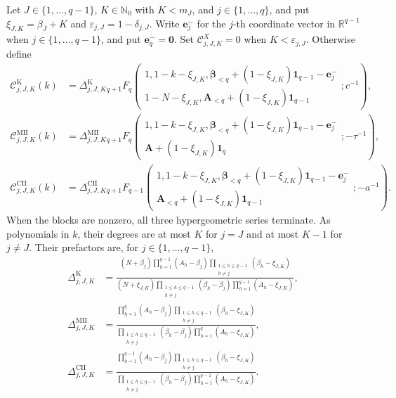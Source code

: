 \documentclass[10pt]{amsart}
\newcommand{\Nzero}{\mathbb N_0}
\newcommand{\one}{\boldsymbol 1}
\newcommand{\A}{\boldsymbol A}
\newcommand{\bbeta}{\boldsymbol\beta}
\newcommand{\ee}{\boldsymbol e}
\newcommand{\pFq}[5]{{}_{#1}F_{#2}\!\left(\begin{matrix}#3\\#4\end{matrix};#5\right)}
\theoremstyle{plain}
\theoremstyle{definition}
\theoremstyle{remark}
\begin{document}
Let \(J\in\{1,\ldots,q-1\}\), \(K\in\Nzero\) with \(K<m_J\), and
\(j\in\{1,\ldots,q\}\), and put
\(\xi_{J,K}=\beta_J+K\) and
\(\varepsilon_{j,J}=1-\delta_{j,J}\).
Write \(\ee_j^-\) for the \(j\)-th coordinate vector in
\(\mathbb R^{q-1}\) when \(j\in\{1,\ldots,q-1\}\), and put
\(\ee_q^-=\boldsymbol0\).
Set \(\mathcal C_{j,J,K}^X=0\) when
\(K<\varepsilon_{j,J}\).  Otherwise define
\begin{align}
 \mathcal C_{j,J,K}^{\mathrm K}(k)
 &=\Delta_{j,J,K}^{\mathrm K}
 \pFq{q+1}{q}
 {1,1-k-\xi_{J,K},
  \bbeta_{<q}+(1-\xi_{J,K})\one_{q-1}-\ee_j^-}
 {1-N-\xi_{J,K},
  \A_{<q}+(1-\xi_{J,K})\one_{q-1}}{c^{-1}},
 \label{eq:K-finite-pole-block}\\
 \mathcal C_{j,J,K}^{\mathrm{MII}}(k)
 &=\Delta_{j,J,K}^{\mathrm{MII}}
 \pFq{q+1}{q}
 {1,1-k-\xi_{J,K},
  \bbeta_{<q}+(1-\xi_{J,K})\one_{q-1}-\ee_j^-}
 {\A+(1-\xi_{J,K})\one_q}{-\tau^{-1}},
 \label{eq:MII-finite-pole-block}\\
 \mathcal C_{j,J,K}^{\mathrm{CII}}(k)
 &=\Delta_{j,J,K}^{\mathrm{CII}}
 \pFq{q+1}{q-1}
 {1,1-k-\xi_{J,K},
  \bbeta_{<q}+(1-\xi_{J,K})\one_{q-1}-\ee_j^-}
 {\A_{<q}+(1-\xi_{J,K})\one_{q-1}}{-a^{-1}}.
 \label{eq:CII-finite-pole-block}
\end{align}
When the blocks are nonzero, all three hypergeometric series terminate. As
polynomials in \(k\), their degrees are at most \(K\) for \(j=J\) and at
most \(K-1\) for \(j\ne J\). Their prefactors are, for
\(j\in\{1,\ldots,q-1\}\),
\begin{align}
 \Delta_{j,J,K}^{\mathrm K}
 &=\frac{(N+\beta_j)
   \prod_{h=1}^{q-1}(A_h-\beta_j)
   \prod_{\substack{1\le h\le q-1\\h\ne j}}(\beta_h-\xi_{J,K})}
  {(N+\xi_{J,K})
   \prod_{\substack{1\le h\le q-1\\h\ne j}}(\beta_h-\beta_j)
   \prod_{h=1}^{q-1}(A_h-\xi_{J,K})},
 \label{eq:K-finite-pole-prefactor-row}\\
 \Delta_{j,J,K}^{\mathrm{MII}}
 &=\frac{\prod_{h=1}^{q}(A_h-\beta_j)
   \prod_{\substack{1\le h\le q-1\\h\ne j}}(\beta_h-\xi_{J,K})}
  {\prod_{\substack{1\le h\le q-1\\h\ne j}}(\beta_h-\beta_j)
   \prod_{h=1}^{q}(A_h-\xi_{J,K})},
 \label{eq:MII-finite-pole-prefactor-row}\\
 \Delta_{j,J,K}^{\mathrm{CII}}
 &=\frac{\prod_{h=1}^{q-1}(A_h-\beta_j)
   \prod_{\substack{1\le h\le q-1\\h\ne j}}(\beta_h-\xi_{J,K})}
  {\prod_{\substack{1\le h\le q-1\\h\ne j}}(\beta_h-\beta_j)
   \prod_{h=1}^{q-1}(A_h-\xi_{J,K})}.
 \label{eq:CII-finite-pole-prefactor-row}
\end{align}
\end{document}
